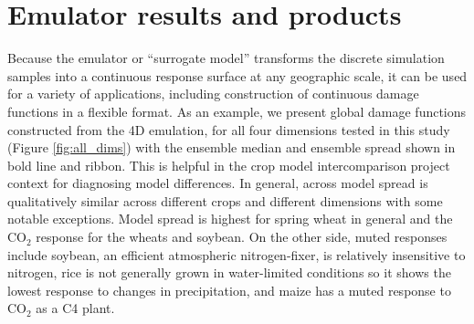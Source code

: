 \documentclass[gmd, manuscript]{copernicus} %
\begin{document}
\section{Emulator results and products}
\label{S:5}
Because the emulator or ``surrogate model'' transforms the discrete simulation samples into a continuous response surface at any geographic scale, it can be used for a variety of applications, including construction of continuous damage functions in a flexible format. 
As an example, we present global damage functions constructed from the 4D emulation, for all four dimensions tested in this study (Figure \ref{fig:all_dims}) with the ensemble median and ensemble spread shown in bold line and ribbon. 
This is helpful in the crop model intercomparison project context for diagnosing model differences. 
In general, across model spread is qualitatively similar across different crops and different dimensions with some notable exceptions. 
Model spread is highest for spring wheat in general and the CO$_2$ response for the wheats and soybean.
On the other side, muted responses include soybean, an efficient atmospheric nitrogen-fixer, is relatively insensitive to nitrogen, rice is not generally grown in water-limited conditions so it shows the lowest response to changes in precipitation, and maize has a muted response to CO$_2$ as a C4 plant.
\end{document}
